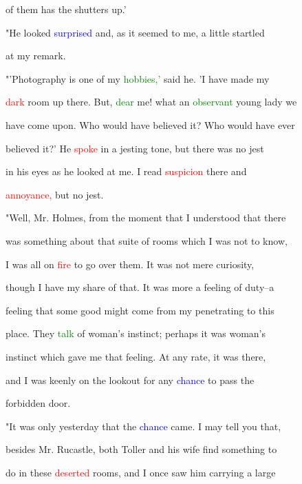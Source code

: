  of them has the shutters up.'



 "He looked \textcolor{blue}{surprised} and, as it seemed to me, a little \textcolor{BurntOrange}{startled}

 at my remark.



 "'Photography is one of my \textcolor{green}{hobbies,'} said he. 'I have made my

 \textcolor{red}{dark} room up there. But, \textcolor{green}{dear} me! what an \textcolor{green}{observant} \textcolor{BurntOrange}{young} lady we

 have come upon. Who would have believed it? Who would have ever

 believed it?' He \textcolor{red}{spoke} in a jesting tone, but there was no \textcolor{BurntOrange}{jest}

 in his eyes as he looked at me. I read \textcolor{red}{suspicion} there and

 \textcolor{red}{annoyance,} but no \textcolor{BurntOrange}{jest.}



 "Well, Mr. Holmes, from the moment that I understood that there

 was something about that suite of rooms which I was not to know,

 I was all on \textcolor{red}{fire} to go over them. It was not mere \textcolor{BurntOrange}{curiosity,}

 though I have my \textcolor{BurntOrange}{share} of that. It was more a feeling of duty--a

 feeling that some \textcolor{BurntOrange}{good} might come from my penetrating to this

 place. They \textcolor{green}{talk} of woman's instinct; perhaps it was woman's

 instinct which gave me that feeling. At any rate, it was there,

 and I was keenly on the lookout for any \textcolor{blue}{chance} to pass the

 forbidden door.



 "It was only yesterday that the \textcolor{blue}{chance} came. I may tell you that,

 besides Mr. Rucastle, both Toller and his wife find something to

 do in these \textcolor{red}{deserted} rooms, and I once saw him carrying a large

